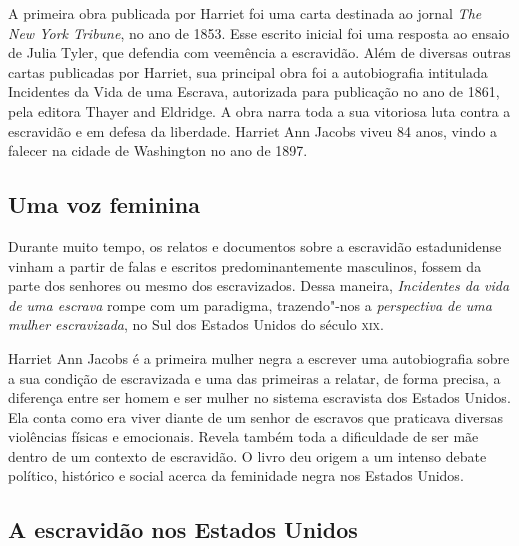 \documentclass[11pt]{extarticle}
\begin{document}
A primeira obra publicada por Harriet foi uma carta destinada ao jornal
\emph{The New York Tribune}, no ano de 1853. Esse escrito inicial foi
uma resposta ao ensaio de Julia Tyler, que defendia com veemência a
escravidão. Além de diversas outras cartas publicadas por Harriet, sua
principal obra foi a autobiografia intitulada Incidentes da Vida de uma
Escrava, autorizada para publicação no ano de 1861, pela editora Thayer
and Eldridge. A obra narra toda a sua vitoriosa luta contra a escravidão
e em defesa da liberdade. Harriet Ann Jacobs viveu 84 anos, vindo a
falecer na cidade de Washington no ano de 1897.






\subsection{Uma voz feminina}

Durante muito tempo, os relatos e documentos sobre a escravidão
estadunidense vinham a partir de falas e escritos predominantemente
masculinos, fossem da parte dos senhores ou mesmo dos escravizados.
Dessa maneira, \emph{Incidentes da vida de uma escrava} rompe com um
paradigma, trazendo"-nos a \emph{perspectiva de uma mulher
escravizada}, no Sul dos Estados Unidos do século \textsc{xix}.




Harriet Ann Jacobs é a primeira mulher negra a escrever uma
autobiografia sobre a sua condição de escravizada e uma das primeiras a
relatar, de forma precisa, a diferença entre ser homem e ser mulher no
sistema escravista dos Estados Unidos. Ela conta como era viver diante
de um senhor de escravos que praticava diversas violências físicas e
emocionais. Revela também toda a dificuldade de ser mãe dentro de um
contexto de escravidão. O livro deu origem a um intenso debate político,
histórico e social acerca da feminidade negra nos Estados Unidos.

\subsection{A escravidão nos Estados Unidos}
\end{document}
